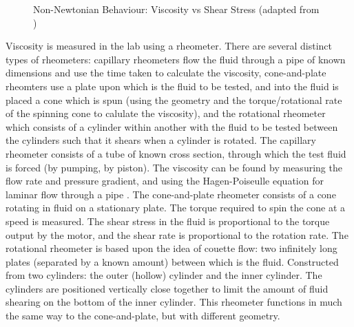 \documentclass[twoside,a4]{report}
\def\br{\newline \newline \noindent}
\begin{document}
	\begin{figure}[!htb]
		\centering
		\label{figshearthinthick}
		\caption{Non-Newtonian Behaviour: Viscosity vs Shear Stress (adapted from \cite{figshearthin, figshearthick})}
	\end{figure}
	\noindent
	Viscosity is measured in the lab using a rheometer. There are several distinct types of rheometers: capillary rheometers flow the fluid through a pipe of known dimensions and use the time taken to calculate the viscosity, cone-and-plate rheomters use a plate upon which is the fluid to be tested, and into the fluid is placed a cone which is spun (using the geometry and the torque/rotational rate of the spinning cone to calulate the viscosity), and the rotational rheometer which consists of a cylinder within another with the fluid to be tested between the cylinders such that it shears when a cylinder is rotated. \br
	The capillary rheometer consists of a tube of known cross section, through which the test fluid is forced (by pumping, by piston). The viscosity can be found by measuring the flow rate and pressure gradient, and using the Hagen-Poiseulle equation for laminar flow through a pipe \cite{backcaprheom}.\br
	The cone-and-plate rheometer consists of a cone rotating in fluid on a stationary plate. The torque required to spin the cone at a speed is measured. The shear stress in the fluid is proportional to the torque output by the motor, and the shear rate is proportional to the rotation rate.\br %
	The rotational rheometer is based upon the idea of couette flow: two infinitely long plates (separated by a known amount) between which is the fluid. Constructed from two cylinders: the outer (hollow) cylinder and the inner cylinder. The cylinders are positioned vertically close together to limit the amount of fluid shearing on the bottom of the inner cylinder. This rheometer functions in much the same way to the cone-and-plate, but with different geometry.
	
\end{document}
